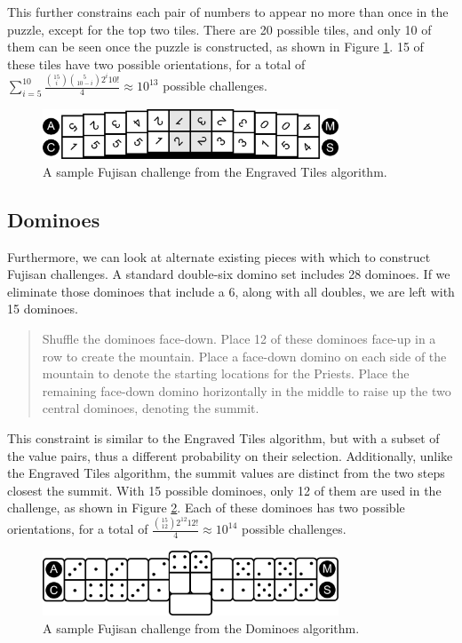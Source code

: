 \documentclass[10pt,journal,compsoc]{IEEEtran}
\begin{document}
This further constrains each pair of numbers to appear no more than once in the puzzle, except for the top two tiles. There are 20 possible tiles, and only 10 of them can be seen once the puzzle is constructed, as shown in Figure \ref{fig:tileexample}. 15 of these tiles have two possible orientations, for a total of $\sum_{i = 5}^{10}\frac{{15 \choose i}\binom{5}{10 - i}2^{i}10!}{4} \approx 10^{13}
$ possible challenges.

\begin{figure}[b]
\includegraphics[width=8.8cm]{fujisan-engraved.png}
\caption{A sample Fujisan challenge from the Engraved Tiles algorithm.}
\label{fig:tileexample}
\end{figure}


\subsection{Dominoes}
Furthermore, we can look at alternate existing pieces with which to construct Fujisan challenges. A standard double-six domino set includes 28 dominoes. If we eliminate those dominoes that include a 6, along with all doubles, we are left with 15 dominoes. 

\begin{quote}
    
  Shuffle the dominoes face-down. Place 12 of these dominoes face-up in a row to create the mountain. Place a face-down domino on each side of the mountain to denote the starting locations for the Priests. Place the remaining face-down domino horizontally in the middle to raise up the two central dominoes, denoting the summit.
\end{quote}

This constraint is similar to the Engraved Tiles algorithm, but with a subset of the value pairs, thus a different probability on their selection.  Additionally, unlike the Engraved Tiles algorithm, the summit values are distinct from the two steps closest the summit.
With 15 possible dominoes, only 12 of them are used in the challenge, as shown in Figure \ref{fig:dominoexample}. Each of these dominoes has two possible orientations, for a total of $\frac{{15 \choose 12}2^{12}12!}{4} \approx 10^{14}$ possible challenges. 

\begin{figure}[b]
\includegraphics[width=8.8cm]{dominoexample.png}
\caption{A sample Fujisan challenge from the Dominoes algorithm.}
\label{fig:dominoexample}
\end{figure}
\end{document}
